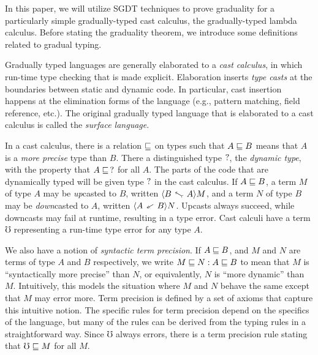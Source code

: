 
In this paper, we will utilize SGDT techniques to prove graduality for a particularly
simple gradually-typed cast calculus, the gradually-typed lambda calculus.
Before stating the graduality theorem, we introduce some definitions related to gradual typing.

Gradually typed languages are generally elaborated to a \emph{cast calculus}, in which run-time type checking
that is made explicit. Elaboration inserts \emph{type casts} at the boundaries between static and dynamic code.
In particular, cast insertion happens at the elimination forms of the language (e.g., pattern matching, field reference, etc.).
The original gradually typed language that is elaborated to a cast calculus is called the \emph{surface language}.

In a cast calculus, there is a relation $\sqsubseteq$ on types such that $A \sqsubseteq B$ means that
$A$ is a \emph{more precise} type than $B$.
There a distinguished type $?$, the \emph{dynamic type}, with the property that $A \sqsubseteq\, ?$ for all $A$.
The parts of the code that are dynamically typed will be given type $?$ in the cast calculus.
%
If $A \sqsubseteq B$, a term $M$ of type $A$ may be \emph{up}casted to $B$, written $\up A B M$,
and a term $N$ of type $B$ may be \emph{down}casted to $A$, written $\dn A B N$.
Upcasts always succeed, while downcasts may fail at runtime, resulting in a type error.
Cast calculi have a term $\mho$ representing a run-time type error for any type $A$.

We also have a notion of \emph{syntactic term precision}.
If $A \sqsubseteq B$, and $M$ and $N$ are terms of type $A$ and $B$ respectively, we write
$M \sqsubseteq N : A \sqsubseteq B$ to mean that
$M$ is ``syntactically more precise'' than $N$, or equivalently, $N$ is 
``more dynamic'' than $M$. Intuitively, this models the situation where $M$ and $N$
behave the same except that $M$ may error more.
Term precision is defined by a set of axioms that capture this intuitive notion.
The specific rules for term precision depend on the specifics of the language, but
many of the rules can be derived from the typing rules in a straightforward way.
Since $\mho$ always errors, there is a term precision rule stating that $\mho \sqsubseteq M$ for all $M$.

